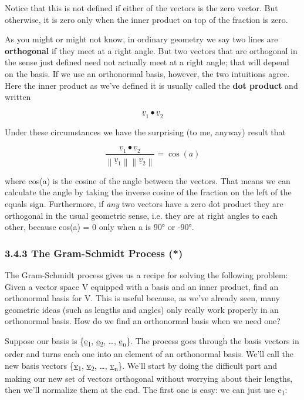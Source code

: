 \documentclass[oneside,english]{amsbook}
\numberwithin{section}{chapter}
\theoremstyle{plain}
\theoremstyle{definition}
\begin{document}
Notice that this is not defined if either of the vectors is the zero
vector. But otherwise, it is zero only when the inner product on top of
the fraction is zero.

As you might or might not know, in ordinary geometry we say two lines
are \textbf{orthogonal} if they meet at a right angle. But two vectors
that are orthogonal in the sense just defined need not actually meet at
a right angle; that will depend on the basis. If we use an orthonormal
basis, however, the two intuitions agree. Here the inner product as
we've defined it is usually called the \textbf{dot product} and written

\[{\underline{v}}_{1} \bullet {\underline{v}}_{2}\]

Under these circumstances we have the surprising (to me, anyway) result
that

\[\frac{{\underline{v}}_{1} \bullet {\underline{v}}_{2}}{\left\| {\underline{v}}_{1} \right\|\left\| {\underline{v}}_{2} \right\|} = \cos{(a)}\]

where cos(a) is the cosine of the angle between the vectors. That means
we can calculate the angle by taking the inverse cosine of the fraction
on the left of the equals sign. Furthermore, if \emph{any} two vectors
have a zero dot product they are orthogonal in the usual geometric
sense, i.e. they are at right angles to each other, because cos(a) = 0
only when a is 90° or -90°.

\subsubsection{3.4.3 The Gram-Schmidt Process
	(*)}\label{the-gram-schmidt-process}

The Gram-Schmidt process gives us a recipe for solving the following
problem: Given a vector space V equipped with a basis and an inner
product, find an orthonormal basis for V. This is useful because, as
we've already seen, many geometric ideas (such as lengths and angles)
only really work properly in an orthonormal basis. How do we find an
orthonormal basis when we need one?

Suppose our basis is \{\ul{e}\textsubscript{1}, \ul{e}\textsubscript{2},
\ldots, \ul{e}\textsubscript{n}\}. The process goes through the basis
vectors in order and turns each one into an element of an orthonormal
basis. We'll call the new basis vectors \{\ul{v}\textsubscript{1},
\ul{v}\textsubscript{2}, \ldots, \ul{v}\textsubscript{n}\}. We'll start
by doing the difficult part and making our new set of vectors orthogonal
without worrying about their lengths, then we'll normalize them at the
end. The first one is easy: we can just use e\textsubscript{1}:
\end{document}
